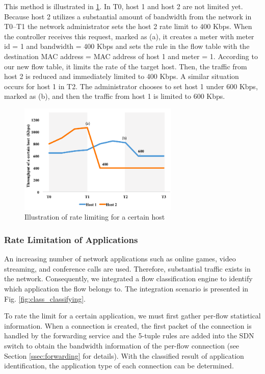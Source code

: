 \documentclass[10pt,journal]{IEEEtran}
\begin{document}
This method is illustrated in \ref{fig:mft_qos_rate_host}. In T0, host 1 and host 2 are not limited yet. Because host 2 utilizes a substantial amount of bandwidth from the network in T0–T1  the network administrator sets the host 2 rate limit to 400 Kbps. When the controller receives this request, marked as (a), it creates a meter with meter id = 1 and bandwidth = 400 Kbps and sets the rule in the flow table with the destination MAC address = MAC address of host 1 and meter = 1. According to our new flow table, it limits the rate of the target host. Then, the traffic from host 2 is reduced and immediately limited to 400 Kbps. A similar situation occurs for host 1 in T2. The administrator chooses to set host 1 under 600 Kbps, marked as (b), and then the traffic from host 1 is limited to 600 Kbps.

\begin{figure}[!t]
\centering
\includegraphics[width=3in]{./figures/mft_qos_rate_host}
\caption{Illustration of rate limiting for a certain host}
\label{fig:mft_qos_rate_host}
\end{figure}

\subsubsection{Rate Limitation of Applications}

An increasing number of network applications such as online games, video streaming, and conference calls are used. Therefore, substantial traffic exists in the network. Consequently, we integrated a flow classification engine to identify which application the flow belongs to. The integration scenario is presented in Fig. \ref{fig:class_classifying}.

To rate the limit for a certain application, we must first gather per-flow statistical information. When a connection is created, the first packet of the connection is handled by the forwarding service and the 5-tuple rules are added into the SDN switch to obtain the bandwidth information of the per-flow connection (see Section \ref{ssec:forwarding} for details). With the classified result of application identification, the application type of each connection can be determined.
\end{document}
